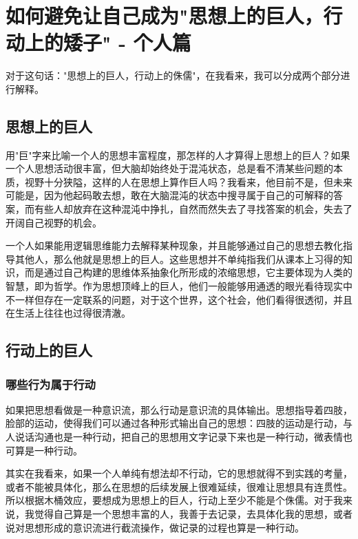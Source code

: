 
\chapter{如何避免让自己成为"思想上的巨人，行动上的矮子" - 个人篇}

对于这句话："思想上的巨人，行动上的侏儒"，在我看来，我可以分成两个部分进行解释。

\section{思想上的巨人}

用"巨"字来比喻一个人的思想丰富程度，那怎样的人才算得上思想上的巨人？如果一个人思想活动很丰富，但大脑却始终处于混沌状态，总是看不清某些问题的本质，视野十分狭隘，这样的人在思想上算作巨人吗？我看来，他目前不是，但未来可能是，因为他起码敢去想，敢在大脑混沌的状态中搜寻属于自己的可解释的答案，而有些人却放弃在这种混沌中挣扎，自然而然失去了寻找答案的机会，失去了开阔自己视野的机会。

一个人如果能用逻辑思维能力去解释某种现象，并且能够通过自己的思想去教化指导其他人，那么他就是思想上的巨人。这些思想并不单纯指我们从课本上习得的知识，而是通过自己构建的思维体系抽象化所形成的浓缩思想，它主要体现为人类的智慧，即为哲学。作为思想顶峰上的巨人，他们一般能够用通透的眼光看待现实中不一样但存在一定联系的问题，对于这个世界，这个社会，他们看得很透彻，并且在生活上往往也过得很清澈。

\section{行动上的巨人}

\subsection{哪些行为属于行动}
如果把思想看做是一种意识流，那么行动是意识流的具体输出。思想指导着四肢，脸部的运动，使得我们可以通过各种形式输出自己的思想：四肢的运动是行动，与人说话沟通也是一种行动，把自己的思想用文字记录下来也是一种行动，微表情也可算是一种行动。

其实在我看来，如果一个人单纯有想法却不行动，它的思想就得不到实践的考量，或者不能被具体化，那么在思想的后续发展上很难延续，很难让思想具有连贯性。所以根据木桶效应，要想成为思想上的巨人，行动上至少不能是个侏儒。对于我来说，我觉得自己算是一个思想丰富的人，我善于去记录，去具体化我的思想，或者说对思想形成的意识流进行截流操作，做记录的过程也算是一种行动。

